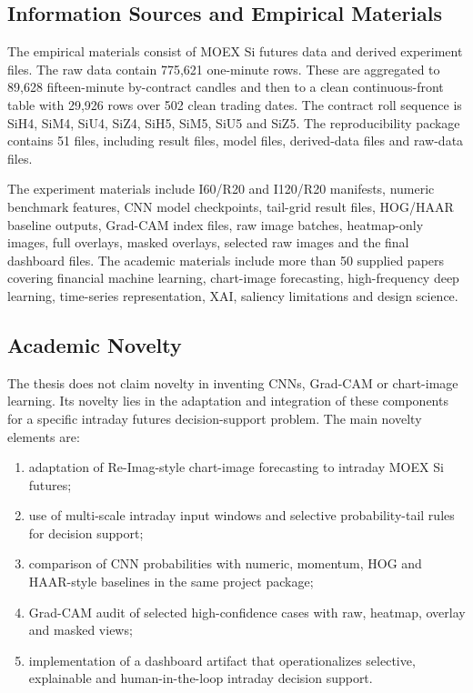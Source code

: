 \subsection{Information Sources and Empirical Materials}
\label{subsec:information_sources}

The empirical materials consist of MOEX Si futures data and derived experiment files. The raw data contain 775,621 one-minute rows. These are aggregated to 89,628 fifteen-minute by-contract candles and then to a clean continuous-front table with 29,926 rows over 502 clean trading dates. The contract roll sequence is SiH4, SiM4, SiU4, SiZ4, SiH5, SiM5, SiU5 and SiZ5. The reproducibility package contains 51 files, including result files, model files, derived-data files and raw-data files.

The experiment materials include I60/R20 and I120/R20 manifests, numeric benchmark features, CNN model checkpoints, tail-grid result files, HOG/HAAR baseline outputs, Grad-CAM index files, raw image batches, heatmap-only images, full overlays, masked overlays, selected raw images and the final dashboard files. The academic materials include more than 50 supplied papers covering financial machine learning, chart-image forecasting, high-frequency deep learning, time-series representation, XAI, saliency limitations and design science.

\subsection{Academic Novelty}
\label{subsec:novelty}

The thesis does not claim novelty in inventing CNNs, Grad-CAM or chart-image learning. Its novelty lies in the adaptation and integration of these components for a specific intraday futures decision-support problem. The main novelty elements are:

\begin{enumerate}
    \item adaptation of Re-Imag-style chart-image forecasting to intraday MOEX Si futures;
    \item use of multi-scale intraday input windows and selective probability-tail rules for decision support;
    \item comparison of CNN probabilities with numeric, momentum, HOG and HAAR-style baselines in the same project package;
    \item Grad-CAM audit of selected high-confidence cases with raw, heatmap, overlay and masked views;
    \item implementation of a dashboard artifact that operationalizes selective, explainable and human-in-the-loop intraday decision support.
\end{enumerate}

